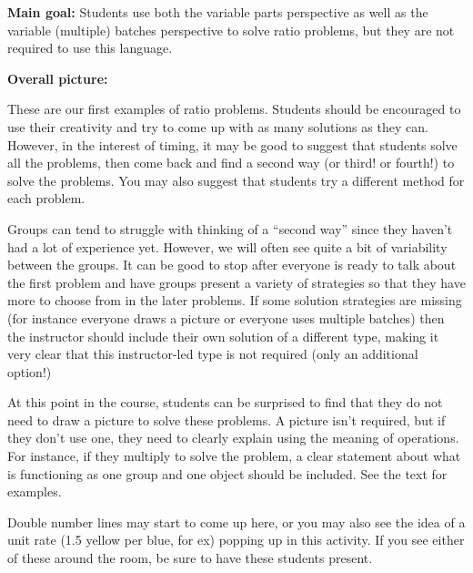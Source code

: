 \documentclass{ximera}
\begin{document}
\begin{instructorNotes}

{\bf Main goal:} Students use both the variable parts perspective as well as the variable (multiple) batches perspective to solve ratio problems, but they are not required to use this language.

{\bf Overall picture:}

These are our first examples of ratio problems. Students should be encouraged to use their creativity and try to come up with as many solutions as they can. However, in the interest of timing, it may be good to suggest that students solve all the problems, then come back and find a second way (or third! or fourth!) to solve the problems. You may also suggest that students try a different method for each problem.

Groups can tend to struggle with thinking of a ``second way'' since they haven't had a lot of experience yet. However, we will often see quite a bit of variability between the groups. It can be good to stop after everyone is ready to talk about the first problem and have groups present a variety of strategies so that they have more to choose from in the later problems. If some solution strategies are missing (for instance everyone draws a picture or everyone uses multiple batches) then the instructor should include their own solution of a different type, making it very clear that this instructor-led type is not required (only an additional option!)

At this point in the course, students can be surprised to find that they do not need to draw a picture to solve these problems. A picture isn't required, but if they don't use one, they need to clearly explain using the meaning of operations. For instance, if they multiply to solve the problem, a clear statement about what is functioning as one group and one object should be included. See the text for examples.

Double number lines may start to come up here, or you may also see the idea of a unit rate (1.5 yellow per blue, for ex) popping up in this activity.  If you see either of these around the room, be sure to have these students present.

%


\end{instructorNotes}
\end{document}
